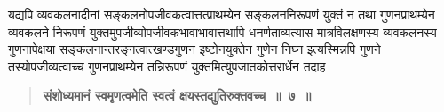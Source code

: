 \documentclass[11pt, openany]{book}
\begin{document}
\begin{sloppypar}
{\small यद्यपि व्यवकलनादीनां सङ्कलनोपजीवकत्वात्तत्प्राथम्येन सङ्कलननिरूपणं युक्तं न तथा गुणनप्राथम्येन व्यवकलने निरूपणं युक्तमुपजीव्योपजीवकभावाभावात्तथापि धनर्णताव्यत्यास-मात्रविलक्षणस्य व्यवकलनस्य गुणनापेक्षया सङ्कलनान्तरङ्गत्वात्खण्डगुणन इष्टोनयुक्तेन गुणेन निघ्न इत्यस्मिन्नपि गुणने तस्योपजीव्यत्वाच्च गुणनप्राथम्येन तन्निरूपणं युक्तमित्युपजातकोत्तरार्धेन तदाह\textendash }

 \label{1.7}
\begin{quote}
{\large \textbf{{\color{purple}संशोध्यमानं स्वमृणत्वमेति स्वत्वं क्षयस्तद्युतिरुक्तवच्च~॥~७~॥ }}}
\end{quote}

\end{sloppypar}

\newpage

\begin{sloppypar}

\end{sloppypar}
\end{document}
